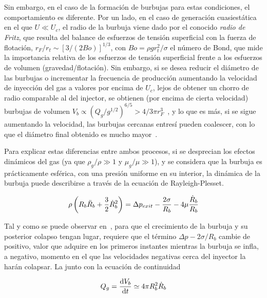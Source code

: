 Sin embargo, en el caso de la formación  de burbujas para estas condiciones, el comportamiento es diferente. Por un lado, en el caso de generación cuasiestática en el que $U \ll U_{c}$, el radio de la burbuja viene dado por el conocido \emph{radio de Fritz}, que resulta del balance de esfuerzos de tensión superficial con la fuerza de flotación, $r_{F}/r_{t} \sim \left[3/(2Bo)\right]^{1/3}$, con $Bo = \rho g r_{t}^{2}/\sigma$ el número de Bond, que mide la importancia relativa de los esfuerzos de tensión superficial frente a los esfuerzos de volumen  (gravedad/flotación). Sin embargo, si se desea reducir el diámetro de las burbujas o incrementar la frecuencia de producción aumentando la velocidad de inyección del gas a valores por encima de $U_{c}$, lejos de obtener un chorro de radio comparable al del injector, se obtienen (por encima de cierta velocidad) burbujas de volumen $V_{b} \propto \left(Q_{g}/g^{1/2}\right)^{6/5} > 4/3\pi r_{F}^{3}$~\cite{Rodriguez-Rodriguez2015b}, y lo que es más, si se sigue aumentando la velocidad, las burbujas cercanas entresí pueden coalescer, con lo que el diámetro final obtenido es mucho mayor~\cite{Higuera2006}. 

Para explicar estas diferencias entre ambos procesos, si se desprecian los efectos dinámicos del gas (ya que $\rho_{g}/\rho \gg 1$ y $\mu_{g}/\mu  \gg 1$), y se considera que la burbuja es prácticamente esférica, con una presión uniforme en su interior, la dinámica de la burbuja puede describirse a través de la ecuación de Rayleigh-Plesset.

\begin{equation}\LABEQ{rayleighPlesset}
\rho\left(R_{b}\ddot{R}_{b} + \dfrac{3}{2}\dot{R}_{b}^{2}\right) = \Delta p_{exit} - \dfrac{2\sigma}{R_{b}} - 4\mu \dfrac{\dot{R}_{b}}{R_{b}}
\end{equation}

Tal y como se puede observar en~\cite{Rodriguez-Rordiguez2015b}, para que el crecimiento de la burbuja y su posterior colapso tengan lugar, requiere que el término $\Delta p - 2\sigma/R_{b}$ cambie de positivo, valor que adquire en los primeros instantes mientras la burbuja se infla, a negativo, momento en el que las velocidades negativas cerca del inyector  la harán colapsar. La  junto con la ecuación de continuidad

\begin{equation}\LABEQ{continuidad}
Q_{g} = \dfrac{\mathrm{d}V_{b}}{\mathrm{d}t} \simeq 4\pi R_{b}^{2} \dot{R}_{b}
\end{equation}

